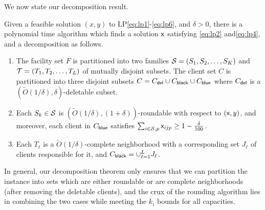 \noindent
 We now state our decomposition result. 
\begin{theorem}\label{thm:decomp}
	Given a feasible solution $(x,y)$ to LP\eqref{eq:lp1}-\eqref{eq:lp6}, and $\delta > 0$, there is a polynomial time algorithm which finds a solution ${\mathsf x}$ satisfying \eqref{eq:lp2} and\eqref{eq:lp4}, and a
	decomposition as follows.
	\begin{enumerate}%
		\item The facility set $F$ is partitioned into two families ${\cal S} = (S_1, S_2, \ldots, S_K)$ and ${\cal T} = (T_1, T_2, \ldots, T_L)$ of mutually disjoint subsets.
		The client set $C$ is partitioned into three disjoint subsets $C = C_{\mathsf{del}} \cup C_{\mathsf{black}} \cup C_{\mathsf{blue}}$ where $C_{\mathsf{del}}$ is a $(\tilde{O}(1/\delta),\delta)$-deletable subset.
		
			\item Each $S_k \in {\cal S}$ is $(\tilde{O}(1/\delta),(1+\delta))$-roundable with respect to $({\mathsf x},y)$, and moreover, each client in $C_{\mathsf{blue}}$ satisfies $\sum_{i \in {\cal S}, p} {\mathsf x}_{ijp} \geq 1 - \frac{\delta}{100}$.
		\item Each $T_\ell$ is a $\tilde{O}(1/\delta)$-complete neighborhood with a corresponding set $J_\ell$ of clients responsible for it, and $C_{\mathsf{black}} = \cup_{\ell = 1}^L J_\ell$.	
%		
%		
%		
	\end{enumerate}
\end{theorem}

\noindent
In general, our decomposition theorem only ensures that we can partition the instance into sets which are either roundable or are complete neighborhoods (after removing the 
deletable clients), and the crux of the rounding algorithm lies in combining the two cases while meeting the $k_i$ bounds for all capacities. 



